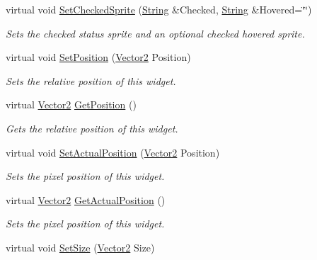 \begin{DoxyCompactItemize}
virtual void \hyperlink{classphys_1_1UI_1_1CheckBox_a9598df1ead97132562c3c99aaefbd34c}{SetCheckedSprite} (\hyperlink{namespacephys_aa03900411993de7fbfec4789bc1d392e}{String} \&Checked, \hyperlink{namespacephys_aa03900411993de7fbfec4789bc1d392e}{String} \&Hovered=\char`\"{}\char`\"{})
\begin{DoxyCompactList}\small\item\em Sets the checked status sprite and an optional checked hovered sprite. \item\end{DoxyCompactList}\item 
virtual void \hyperlink{classphys_1_1UI_1_1CheckBox_aaa4723624a25171e07cf35870368fe18}{SetPosition} (\hyperlink{classphys_1_1Vector2}{Vector2} Position)
\begin{DoxyCompactList}\small\item\em Sets the relative position of this widget. \item\end{DoxyCompactList}\item 
virtual \hyperlink{classphys_1_1Vector2}{Vector2} \hyperlink{classphys_1_1UI_1_1CheckBox_a8a8630b27ab769b6e42657c5388ec7fe}{GetPosition} ()
\begin{DoxyCompactList}\small\item\em Gets the relative position of this widget. \item\end{DoxyCompactList}\item 
virtual void \hyperlink{classphys_1_1UI_1_1CheckBox_ad0d6efcf330bb452254beb6ce8ef03f8}{SetActualPosition} (\hyperlink{classphys_1_1Vector2}{Vector2} Position)
\begin{DoxyCompactList}\small\item\em Sets the pixel position of this widget. \item\end{DoxyCompactList}\item 
virtual \hyperlink{classphys_1_1Vector2}{Vector2} \hyperlink{classphys_1_1UI_1_1CheckBox_a33bedaa00456be8ca0e9b2eafcd5b21a}{GetActualPosition} ()
\begin{DoxyCompactList}\small\item\em Sets the pixel position of this widget. \item\end{DoxyCompactList}\item 
virtual void \hyperlink{classphys_1_1UI_1_1CheckBox_a104be5f34ea78cc47a411a106f482d3e}{SetSize} (\hyperlink{classphys_1_1Vector2}{Vector2} Size)

\end{DoxyCompactItemize}
